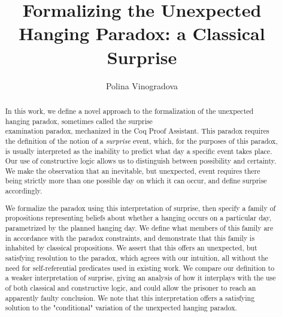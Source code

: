 \documentclass[runningheads]{llncs}
\begin{document}
%
\title{Formalizing the Unexpected Hanging Paradox: a Classical Surprise} %
%
%
\author{Polina Vinogradova }
%
%
%
\maketitle              %
%
\begin{abstract}

  In this work, we define a novel approach to the formalization of the
  unexpected hanging paradox, sometimes called the surprise \\
  examination paradox,
  mechanized in the Coq Proof Assistant.
  This paradox requires the definition of the notion of
  a \emph{surprise} event, which, for the purposes of this paradox, is usually interpreted as
  the inability to predict what day a specific event takes place. Our use of constructive logic allows us to distinguish between possibility and
  certainty.
  We make the observation that an inevitable, but unexpected, event requires there being strictly
  more than one possible day on which it can occur, and define surprise accordingly.

  We
  formalize the paradox using this interpretation of surprise, then
  specify a family of
  propositions representing beliefs about whether a hanging occurs on a particular day,
  parametrized by the planned hanging day.
  We define what members of this family are in accordance with the paradox constraints, and
  demonstrate that this family is inhabited by classical propositions.
  We assert that this offers an unexpected, but satisfying resolution to the paradox, which
  agrees with
  our intuition, all without the need for self-referential predicates used in existing work.
  We compare our definition to a weaker interpretation of surprise,
  giving an analysis of how it interplays with the use of both classical and constructive logic,
  and could allow the prisoner to reach an apparently faulty conclusion. We note
  that this interpretation offers a satisfying solution to the "conditional"
  variation of the unexpected hanging paradox.

\end{abstract}
%
\end{document}
